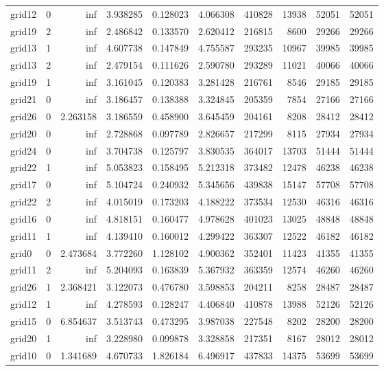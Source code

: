 \begin{longtable}{|l|r|r|r|r|r|r|r|r|r|}
grid12 & 0 & inf & 3.938285 & 0.128023 & 4.066308 & 410828 & 13938 & 52051 & 52051 \\
grid19 & 2 & inf & 2.486842 & 0.133570 & 2.620412 & 216815 & 8600 & 29266 & 29266 \\
grid13 & 1 & inf & 4.607738 & 0.147849 & 4.755587 & 293235 & 10967 & 39985 & 39985 \\
grid13 & 2 & inf & 2.479154 & 0.111626 & 2.590780 & 293289 & 11021 & 40066 & 40066 \\
grid19 & 1 & inf & 3.161045 & 0.120383 & 3.281428 & 216761 & 8546 & 29185 & 29185 \\
grid21 & 0 & inf & 3.186457 & 0.138388 & 3.324845 & 205359 & 7854 & 27166 & 27166 \\
grid26 & 0 & 2.263158 & 3.186559 & 0.458900 & 3.645459 & 204161 & 8208 & 28412 & 28412 \\
grid20 & 0 & inf & 2.728868 & 0.097789 & 2.826657 & 217299 & 8115 & 27934 & 27934 \\
grid24 & 0 & inf & 3.704738 & 0.125797 & 3.830535 & 364017 & 13703 & 51444 & 51444 \\
grid22 & 1 & inf & 5.053823 & 0.158495 & 5.212318 & 373482 & 12478 & 46238 & 46238 \\
grid17 & 0 & inf & 5.104724 & 0.240932 & 5.345656 & 439838 & 15147 & 57708 & 57708 \\
grid22 & 2 & inf & 4.015019 & 0.173203 & 4.188222 & 373534 & 12530 & 46316 & 46316 \\
grid16 & 0 & inf & 4.818151 & 0.160477 & 4.978628 & 401023 & 13025 & 48848 & 48848 \\
grid11 & 1 & inf & 4.139410 & 0.160012 & 4.299422 & 363307 & 12522 & 46182 & 46182 \\
grid0 & 0 & 2.473684 & 3.772260 & 1.128102 & 4.900362 & 352401 & 11423 & 41355 & 41355 \\
grid11 & 2 & inf & 5.204093 & 0.163839 & 5.367932 & 363359 & 12574 & 46260 & 46260 \\
grid26 & 1 & 2.368421 & 3.122073 & 0.476780 & 3.598853 & 204211 & 8258 & 28487 & 28487 \\
grid12 & 1 & inf & 4.278593 & 0.128247 & 4.406840 & 410878 & 13988 & 52126 & 52126 \\
grid15 & 0 & 6.854637 & 3.513743 & 0.473295 & 3.987038 & 227548 & 8202 & 28200 & 28200 \\
grid20 & 1 & inf & 3.228980 & 0.099878 & 3.328858 & 217351 & 8167 & 28012 & 28012 \\
grid10 & 0 & 1.341689 & 4.670733 & 1.826184 & 6.496917 & 437833 & 14375 & 53699 & 53699 \\

\end{longtable}
